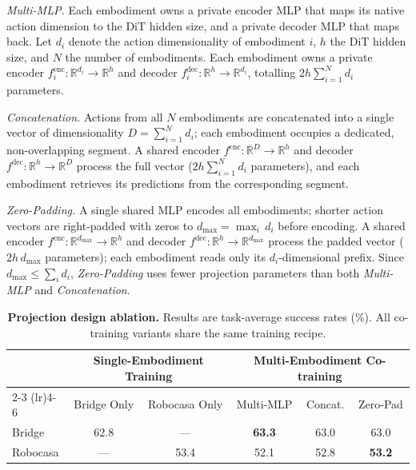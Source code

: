 \documentclass{llmxive}
\begin{document}
\textit{Multi-MLP.}
Each embodiment owns a private encoder MLP that maps its native action
dimension to the DiT hidden size, and a private decoder MLP that maps
back. 
Let $d_i$ denote the action dimensionality of embodiment $i$, $h$ the
DiT hidden size, and $N$ the number of embodiments.  Each embodiment
owns a private encoder $f_i^{\mathrm{enc}}\!: \mathbb{R}^{d_i}\!\to\!\mathbb{R}^{h}$
and decoder $f_i^{\mathrm{dec}}\!: \mathbb{R}^{h}\!\to\!\mathbb{R}^{d_i}$,
totalling \textbf{$2h\!\sum_{i=1}^{N}\!d_i$}  parameters.

\textit{Concatenation.}
Actions from all $N$ embodiments are concatenated into a single vector
of dimensionality $D = \sum_{i=1}^{N} d_i$; each embodiment occupies a
dedicated, non-overlapping segment.  A shared encoder
$f^{\mathrm{enc}}\!: \mathbb{R}^{D}\!\to\!\mathbb{R}^{h}$ and decoder
$f^{\mathrm{dec}}\!: \mathbb{R}^{h}\!\to\!\mathbb{R}^{D}$ process the
full vector (\textbf{$2h\!\sum_{i=1}^{N}\!d_i$} parameters), and each embodiment retrieves its
predictions from the corresponding segment.


\textit{Zero-Padding.}
A single shared MLP encodes all embodiments; shorter action vectors are right-padded with zeros to
$d_{\max} = \max_i\, d_i$ before encoding.  A shared encoder
$f^{\mathrm{enc}}\!: \mathbb{R}^{d_{\max}}\!\to\!\mathbb{R}^{h}$ and
decoder $f^{\mathrm{dec}}\!: \mathbb{R}^{h}\!\to\!\mathbb{R}^{d_{\max}}$
process the padded vector (\textbf{$2h\,d_{\max}$} parameters); each embodiment
reads only its $d_i$-dimensional prefix.  Since
$d_{\max} \leq \sum_i d_i$, \textit{Zero-Padding} uses fewer projection
parameters than both \textit{Multi-MLP} and \textit{Concatenation}.

\begin{table}[htbp]
\centering
\small
\begin{tabular}{l cc ccc}
\toprule
& \multicolumn{2}{c}{Single-Embodiment Training} & \multicolumn{3}{c}{Multi-Embodiment Co-training} \\
\cmidrule(lr){2-3} \cmidrule(lr){4-6}
& Bridge Only & Robocasa Only & Multi-MLP & Concat. & Zero-Pad \\
\midrule
Bridge   & 62.8 & ---  & \textbf{63.3} & 63.0 & 63.0 \\
Robocasa & ---  & 53.4 & 52.1 & 52.8 & \textbf{53.2} \\
\bottomrule
\end{tabular}
\caption{\textbf{Projection design ablation.} Results are task-average success
  rates (\%). All co-training variants share the same training recipe.}
\label{tab:projection_head}
\end{table}
\end{document}
